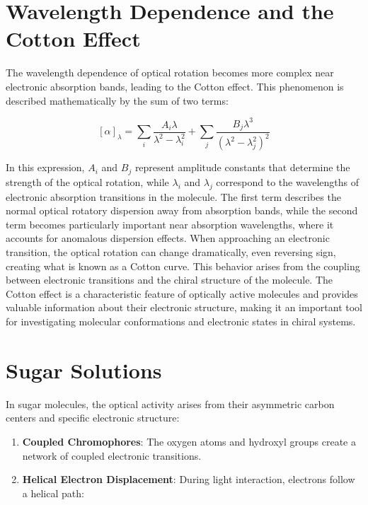 \documentclass[
  a4paper,
]{book}
\begin{document}
\section{Wavelength Dependence and the Cotton
Effect}\label{wavelength-dependence-and-the-cotton-effect}

The wavelength dependence of optical rotation becomes more complex near
electronic absorption bands, leading to the Cotton effect. This
phenomenon is described mathematically by the sum of two terms:

\[[\alpha]_\lambda = \sum_i \frac{A_i\lambda}{\lambda^2 - \lambda_i^2} + \sum_j \frac{B_j\lambda^3}{(\lambda^2 - \lambda_j^2)^2}\]

In this expression, \(A_i\) and \(B_j\) represent amplitude constants
that determine the strength of the optical rotation, while \(\lambda_i\)
and \(\lambda_j\) correspond to the wavelengths of electronic absorption
transitions in the molecule. The first term describes the normal optical
rotatory dispersion away from absorption bands, while the second term
becomes particularly important near absorption wavelengths, where it
accounts for anomalous dispersion effects. When approaching an
electronic transition, the optical rotation can change dramatically,
even reversing sign, creating what is known as a Cotton curve. This
behavior arises from the coupling between electronic transitions and the
chiral structure of the molecule. The Cotton effect is a characteristic
feature of optically active molecules and provides valuable information
about their electronic structure, making it an important tool for
investigating molecular conformations and electronic states in chiral
systems.

\section{Sugar Solutions}\label{sugar-solutions}

In sugar molecules, the optical activity arises from their asymmetric
carbon centers and specific electronic structure:

\begin{enumerate}
\def\labelenumi{\arabic{enumi}.}
\item
  \textbf{Coupled Chromophores}: The oxygen atoms and hydroxyl groups
  create a network of coupled electronic transitions.
\item
  \textbf{Helical Electron Displacement}: During light interaction,
  electrons follow a helical path:
\end{enumerate}
\end{document}
